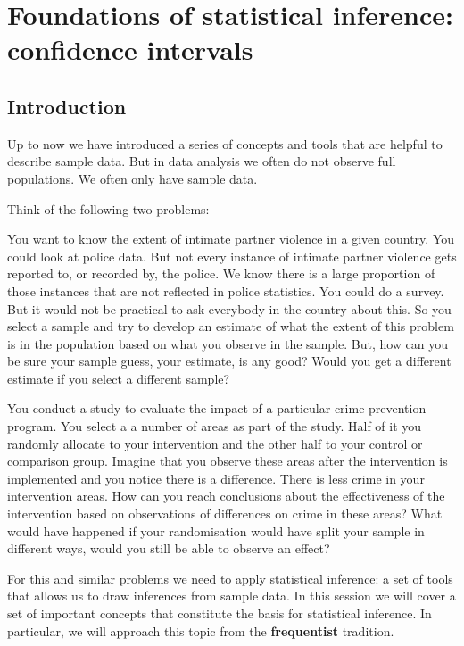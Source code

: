 \documentclass[
]{book}
\begin{document}
\hypertarget{foundations-of-statistical-inference-confidence-intervals}{%
\chapter{Foundations of statistical inference: confidence intervals}\label{foundations-of-statistical-inference-confidence-intervals}}

\hypertarget{introduction-2}{%
\section{Introduction}\label{introduction-2}}

Up to now we have introduced a series of concepts and tools that are helpful to describe sample data. But in data analysis we often do not observe full populations. We often only have sample data.

Think of the following two problems:

You want to know the extent of intimate partner violence in a given country. You could look at police data. But not every instance of intimate partner violence gets reported to, or recorded by, the police. We know there is a large proportion of those instances that are not reflected in police statistics. You could do a survey. But it would not be practical to ask everybody in the country about this. So you select a sample and try to develop an estimate of what the extent of this problem is in the population based on what you observe in the sample. But, how can you be sure your sample guess, your estimate, is any good? Would you get a different estimate if you select a different sample?

You conduct a study to evaluate the impact of a particular crime prevention program. You select a a number of areas as part of the study. Half of it you randomly allocate to your intervention and the other half to your control or comparison group. Imagine that you observe these areas after the intervention is implemented and you notice there is a difference. There is less crime in your intervention areas. How can you reach conclusions about the effectiveness of the intervention based on observations of differences on crime in these areas? What would have happened if your randomisation would have split your sample in different ways, would you still be able to observe an effect?

For this and similar problems we need to apply statistical inference: a set of tools that allows us to draw inferences from sample data. In this session we will cover a set of important concepts that constitute the basis for statistical inference. In particular, we will approach this topic from the \textbf{frequentist} tradition.
\end{document}
